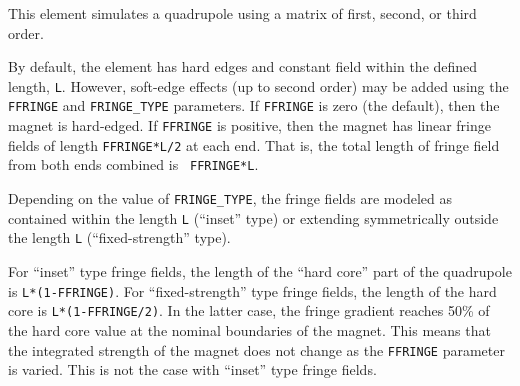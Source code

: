 This element simulates a quadrupole using a matrix of first, second,
or third order.

By default, the element has hard edges and constant field within the
defined length, {\tt L}.  However, soft-edge effects (up to second
order) may be added using the {\tt FFRINGE} and {\tt FRINGE\_TYPE}
parameters.  If {\tt FFRINGE} is zero (the default), then the magnet
is hard-edged.  If {\tt FFRINGE} is positive, then the magnet has
linear fringe fields of length {\tt FFRINGE*L/2} at each end.  That
is, the total length of fringe field from both ends combined is {\tt
FFRINGE*L}.

Depending on the value of {\tt FRINGE\_TYPE}, the fringe fields are
modeled as contained within the length {\tt L} (``inset'' type) or
extending symmetrically outside the length {\tt L} (``fixed-strength''
type).

For ``inset'' type fringe fields, the length of the ``hard core'' part of
the quadrupole is {\tt L*(1-FFRINGE)}.  For ``fixed-strength'' type fringe fields,
the length of the hard core is {\tt L*(1-FFRINGE/2)}.  In the latter case,
the fringe gradient reaches 50\% of the hard core value at the nominal boundaries
of the magnet. This means that the integrated strength of the magnet does not
change as the {\tt FFRINGE} parameter is varied. This is not the case with
``inset'' type fringe fields.

